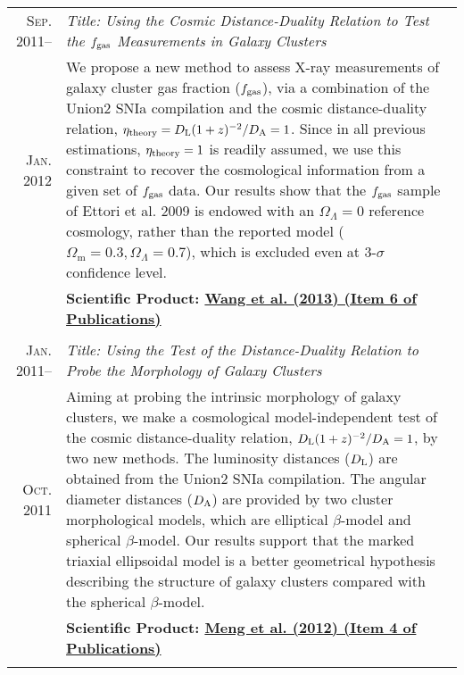 \documentclass[10pt]{article}
\begin{document}
\begin{longtable}{r|p{17cm}}
\textsc{Sep. 2011}--     &   \emph{Title: Using the Cosmic Distance-Duality Relation to Test the $f_{\rm gas}$ Measurements in Galaxy Clusters} \\
\textsc{Jan. 2012}  &   \small{We propose a new method to assess X-ray measurements of galaxy cluster gas fraction ($f_{\rm gas}$), via a combination of the Union2 SNIa compilation and the cosmic distance-duality relation, $\eta_{\rm{theory}}=D_{\rm L}(1+z)^{-2}/D_{\rm A}=1$. Since in all previous estimations, $\eta_{\rm{theory}}=1$ is readily assumed, we use this constraint to recover the cosmological information from a given set of $f_{\rm gas}$ data. Our results show that the $f_{\rm gas}$ sample of Ettori et al. 2009 is endowed with an $\Omega_{\Lambda}=0$ reference cosmology, rather than the reported model ($\Omega_\textrm{m}=0.3,\Omega_{\Lambda}=0.7$), which is excluded even at 3-$\sigma$ confidence level.}\\
&   \textbf{Scientific Product: \hyperlink{6}{Wang et al. (2013) (Item 6 of Publications)}}  \\
\multicolumn{2}{c}{} \\

\textsc{Jan. 2011}--     &   \emph{Title: Using the Test of the Distance-Duality Relation to Probe the Morphology of Galaxy Clusters} \\
\textsc{Oct. 2011}       &   \small{Aiming at probing the intrinsic morphology of galaxy clusters, we make a cosmological model-independent test of the cosmic distance-duality relation, $D_{\rm L}(1+z)^{-2}/D_{\rm A}=1$, by two new methods. The luminosity distances ($D_{\rm L}$) are obtained from the Union2 SNIa compilation. The angular diameter distances ($D_{\rm A}$) are provided by two cluster morphological models, which are elliptical $\beta$-model and spherical $\beta$-model. Our results support that the marked triaxial ellipsoidal model is a better geometrical hypothesis describing the structure of galaxy clusters compared with the spherical $\beta$-model.}    \\
                &   \textbf{Scientific Product: \hyperlink{4}{Meng et al. (2012) (Item 4 of Publications)}} \\
\multicolumn{2}{c}{} \\


\end{longtable}
\end{document}
